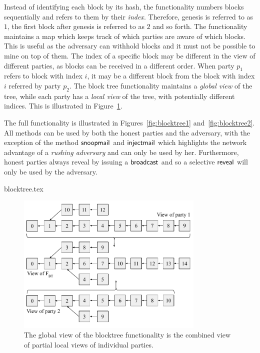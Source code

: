 Instead of identifying each block by its hash, the functionality numbers blocks
sequentially and refers to them by their \emph{index}. Therefore, genesis is
referred to as $1$, the first block after genesis is referred to as $2$ and so
forth. The functionality maintains a map which keeps track of which parties are
aware of which blocks. This is useful as the adversary can withhold blocks and
it must not be possible to mine on top of them. The index of a specific block
may be different in the view of different parties, as blocks can be received in
a different order. When party $p_1$ refers to block with index $i$, it may be a
different block from the block with index $i$ referred by party $p_2$. The
block tree functionality maintains a \emph{global view} of the tree, while each
party has a \emph{local view} of the tree, with potentially different indices.
This is illustrated in Figure~\ref{fig:functionality-views}.

The full functionality is illustrated in Figures~\ref{fig:blocktree1}
and~\ref{fig:blocktree2}. All methods can be used by both the honest parties and
the adversary, with the exception of the method $\textsf{snoopmail}$ and $\textsf{injectmail}$
which highlights the network advantage of a \emph{rushing adversary} and can
only be used by her. Furthermore, honest parties always reveal by issuing a
$\textsf{broadcast}$ and so a selective $\textsf{reveal}$ will only be used by the adversary.

{blocktree.tex}

\begin{figure}
\begin{center}
    \includegraphics[width=0.8\textwidth]{fig/functionality-views.pdf}
  \caption{The global view of the blocktree functionality is the combined view
  of partial local views of individual parties.}
  \label{fig:functionality-views}
  \end{center}
\end{figure}

